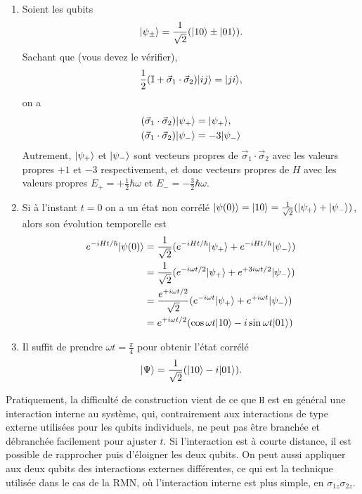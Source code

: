 \begin{example}
\begin{enumerate}
\item Soient les qubits%
\begin{equation}
\vert\psi_\pm\rangle=\frac{1}{\sqrt{2}}(\vert10\rangle\pm\vert01\rangle ).
\end{equation}
Sachant que (vous devez le vérifier),%
\begin{equation}
\frac{1}{2}(\mathbb{I}+\vec{\sigma}_{1}\cdot\vec{\sigma}_{2})\vert ij\rangle
=\vert ji\rangle,
\end{equation}
on a%
\begin{equation}
\begin{split}
(\vec{\sigma}_{1}\cdot\vec{\sigma}_{2})\vert\psi_{+}\rangle & =\vert\psi_{+}\rangle,\\
(\vec{\sigma}_{1}\cdot\vec{\sigma}_{2})\vert\psi_{-}\rangle &
=-3\vert\psi_{-}\rangle
\end{split}
\end{equation}
Autrement, $\vert\psi_{+}\rangle$ et $\vert\psi_{-}\rangle$ sont vecteurs propres de
$\vec{\sigma}_{1}\cdot\vec{\sigma}_{2}$ avec les valeurs propres $+1$ et $-3$
respectivement, et donc vecteurs propres de $H$ avec les valeurs propres
$E_{+}=+\frac{1}{2}\hbar\omega$ et $E_{-}=-\frac{3}{2}\hbar\omega$.

\item Si à l'instant $t=0$ on a un état non corrélé $\vert\psi(0)\rangle=\vert10\rangle
=\frac{1}{\sqrt{2}}(\vert\psi_{+}\rangle+\vert\psi_{-}\rangle)$, alors son évolution
temporelle est%
\begin{equation}
\begin{split}
e^{-iHt/\hbar}\vert\psi(0)\rangle&  =\frac{1}{\sqrt{2}}(e^{-iHt/\hbar}\vert\psi_{+}\rangle
+e^{-iHt/\hbar}\vert\psi_{-}\rangle)\\
&  =\frac{1}{\sqrt{2}}(e^{-i\omega t/2}\vert\psi_{+}\rangle+e^{+3i\omega t/2}
\vert\psi_{-}\rangle)\\
&  =\frac{e^{+i\omega t/2}}{\sqrt{2}}(e^{-i\omega t}\vert\psi_{+}\rangle+e^{+i\omega
t}\vert\psi_{-}\rangle)\\
&  =e^{+i\omega t/2}(\cos\omega t\vert10\rangle -i\sin\omega t\vert01\rangle)
\end{split}
\end{equation}


\item Il suffit de prendre $\omega t=\frac{\pi}{4}$ pour obtenir l'état corrélé%
\begin{equation}
\vert\Psi\rangle=\frac{1}{\sqrt{2}}(\vert10\rangle
-i\vert01\rangle ).
\end{equation}
\end{enumerate}

Pratiquement, la difficulté de construction vient de ce que $\mathtt{H}$ est en
général une interaction interne au système, qui, contrairement aux interactions
de type externe utilisées pour les qubits individuels, ne peut pas être branchée
et débranchée facilement pour ajuster $t$. Si l'interaction est à courte
distance, il est possible de rapprocher puis d'éloigner les deux qubits. On peut
aussi appliquer aux deux qubits des interactions externes différentes, ce qui
est la technique utilisée dans le cas de la RMN, où l'interaction interne est
plus simple, en $\sigma_{1z}\sigma_{2z}$.
\end{example}


